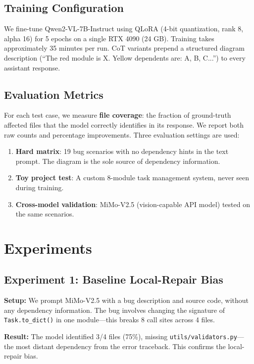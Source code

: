 \documentclass[11pt,a4paper]{article}
\begin{document}
\subsection{Training Configuration}
We fine-tune Qwen2-VL-7B-Instruct using QLoRA (4-bit quantization, rank 8, alpha 16) for 5 epochs on a single RTX 4090 (24 GB). Training takes approximately 35 minutes per run. CoT variants prepend a structured diagram description (``The red module is X. Yellow dependents are: A, B, C...'') to every assistant response.

\subsection{Evaluation Metrics}
For each test case, we measure \textbf{file coverage}: the fraction of ground-truth affected files that the model correctly identifies in its response. We report both raw counts and percentage improvements. Three evaluation settings are used:
\begin{enumerate}[nosep]
\item \textbf{Hard matrix}: 19 bug scenarios with no dependency hints in the text prompt. The diagram is the sole source of dependency information.
\item \textbf{Toy project test}: A custom 8-module task management system, never seen during training.
\item \textbf{Cross-model validation}: MiMo-V2.5 (vision-capable API model) tested on the same scenarios.
\end{enumerate}

\section{Experiments}

\subsection{Experiment 1: Baseline Local-Repair Bias}
\textbf{Setup:} We prompt MiMo-V2.5 with a bug description and source code, without any dependency information. The bug involves changing the signature of \texttt{Task.to\_dict()} in one module---this breaks 8 call sites across 4 files.
\bigskip

\noindent\textbf{Result:} The model identified 3/4 files (75\%), missing \texttt{utils/validators.py}---the most distant dependency from the error traceback. This confirms the local-repair bias.
\end{document}
